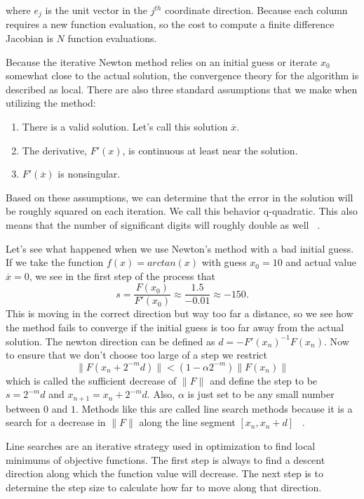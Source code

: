 \documentclass[paper=a4, fontsize=11pt]{scrartcl} %
\numberwithin{equation}{section} %
\numberwithin{figure}{section} %
\numberwithin{table}{section} %
\begin{document}
where $e_j$ is the unit vector in the $j^{th}$ coordinate direction.  Because each column requires a new function evaluation, so the cost to compute a finite difference Jacobian is $N$ function evaluations.  

Because the iterative Newton method relies on an initial guess or iterate $x_0$ somewhat close to the actual solution, the convergence theory for the algorithm is described as local.  There are also three standard assumptions that we make when utilizing the method:
\begin{enumerate}
\item{There is a valid solution.  Let's call this solution $\overline{x}$.  }
\item{The derivative, $F'(x)$, is continuous at least near the solution.  }
\item{$F'(\overline{x})$ is nonsingular.  }
\end{enumerate}
Based on these assumptions, we can determine that the error in the solution will be roughly squared on each iteration.  We call this behavior q-quadratic.  This also means that the number of significant digits will roughly double as well ~\cite{newton_kelley}.  

Let's see what happened when we use Newton's method with a bad initial guess.  If we take the function $f(x) = arctan(x)$ with guess $x_0 = 10$ and actual value $\overline{x} = 0$, we see in the first step of the process that $$ s = \frac{F(x_0)}{F'(x_0)} \approx \frac{1.5}{-0.01} \approx -150. $$
This is moving in the correct direction but way too far a distance, so we see how the method fails to converge if the initial guess is too far away from the actual solution.  The newton direction can be defined as $d = -F'(x_n)^{-1}F(x_n)$.  Now to ensure that we don't choose too large of a step we restrict
$$ \|F(x_n+2^{-m}d)\| < (1- \alpha 2^{-m}) \|F(x_n)\| $$
which is called the sufficient decrease of $\|F\|$ and define the step to be $s = 2^{-m}d$ and $x_{n+1} = x_n + 2^{-m}d$.  Also, $\alpha$ is just set to be any small number between $0$ and $1$.  Methods like this are called line search methods because it is a search for a decrease in $\|F\|$ along the line segment $[x_n,x_n + d]$ ~\cite{newton_kelley}.  

Line searches are an iterative strategy used in optimization to find local minimums of objective functions.  The first step is always to find a descent direction along which the function value will decrease.  The next step is to determine the step size to calculate how far to move along that direction.  
\end{document}

